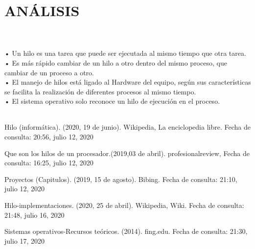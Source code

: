 \documentclass[conference]{IEEEtran}
\begin{document}
\section{ANÁLISIS}
\\
\\
• Un hilo es una tarea que puede ser ejecutada al mismo tiempo que otra tarea.
\\
• Es más rápido cambiar de un hilo a otro dentro del mismo proceso, que cambiar de un proceso a otro.
\\
• El manejo de hilos está ligado al Hardware del equipo, según sus características se facilita la realización de diferentes procesos al mismo tiempo.
\\
• El sistema operativo solo reconoce un hilo de ejecución en el proceso.
\\
\\
\begin{thebibliography}{00}


  Hilo (informática). (2020, 19 de junio). Wikipedia, La enciclopedia libre. Fecha de consulta: 20:56, julio 12, 2020 

 Que son los hilos de un procesador.(2019,03 de abril). profesionalreview, Fecha de consulta: 16:25, julio 12, 2020 

 Proyectos (Capitulos). (2019, 15 de agosto). Bibing. Fecha de consulta: 21:10, julio 12, 2020  

  Hilo-implementaciones. (2020, 25 de abril). Wikipedia, Wiki. Fecha de consulta: 21:48, julio 16, 2020

  Sistemas operativos-Recursos teóricos. (2014). fing.edu. Fecha de consulta: 21:30, julio 17, 2020 



\end{thebibliography}
\end{document}
